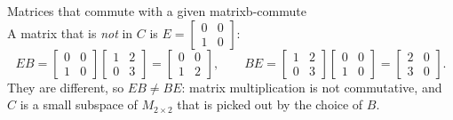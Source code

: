 \documentclass[11pt]{article}
\begin{document}
\begin{exmp}{Matrices that commute with a given matrix}{b-commute}
\[\]
A matrix that is \emph{not} in $C$ is $E=\begin{bmatrix}0&0\\1&0\end{bmatrix}$:
\[
EB=\begin{bmatrix}0&0\\1&0\end{bmatrix}\begin{bmatrix}1&2\\0&3\end{bmatrix}=\begin{bmatrix}0&0\\1&2\end{bmatrix},\qquad
BE=\begin{bmatrix}1&2\\0&3\end{bmatrix}\begin{bmatrix}0&0\\1&0\end{bmatrix}=\begin{bmatrix}2&0\\3&0\end{bmatrix}.
\]
They are different, so $EB\neq BE$: matrix multiplication is not commutative, and $C$ is a small subspace of $M_{2\times2}$ that is picked out by the choice of $B$.
\end{exmp}
\end{document}
